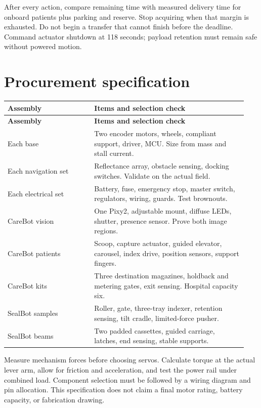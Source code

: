 \documentclass[10pt,a4paper]{article}
\begin{document}
After every action, compare remaining time with measured delivery time for onboard patients plus parking and reserve. Stop acquiring when that margin is exhausted. Do not begin a transfer that cannot finish before the deadline. Command actuator shutdown at 118 seconds; payload retention must remain safe without powered motion.

\section{Procurement specification}
\small\begin{longtable}{@{}>{\raggedright\arraybackslash}p{0.34\linewidth}>{\raggedright\arraybackslash}p{0.6\linewidth}@{}}
\toprule
\textbf{Assembly} & \textbf{Items and selection check} \\
\midrule\endfirsthead
\toprule\textbf{Assembly} & \textbf{Items and selection check} \\\midrule\endhead
Each base & Two encoder motors, wheels, compliant support, driver, MCU. Size from mass and stall current. \\[3pt]
Each navigation set & Reflectance array, obstacle sensing, docking switches. Validate on the actual field. \\[3pt]
Each electrical set & Battery, fuse, emergency stop, master switch, regulators, wiring, guards. Test brownouts. \\[3pt]
CareBot vision & One Pixy2, adjustable mount, diffuse LEDs, shutter, presence sensor. Prove both image regions. \\[3pt]
CareBot patients & Scoop, capture actuator, guided elevator, carousel, index drive, position sensors, support fingers. \\[3pt]
CareBot kits & Three destination magazines, holdback and metering gates, exit sensing. Hospital capacity six. \\[3pt]
SealBot samples & Roller, gate, three-tray indexer, retention sensing, tilt cradle, limited-force pusher. \\[3pt]
SealBot beams & Two padded cassettes, guided carriage, latches, end sensing, stable supports. \\[3pt]
\bottomrule\end{longtable}\normalsize
Measure mechanism forces before choosing servos. Calculate torque at the actual lever arm, allow for friction and acceleration, and test the power rail under combined load. Component selection must be followed by a wiring diagram and pin allocation. This specification does not claim a final motor rating, battery capacity, or fabrication drawing.
\end{document}
